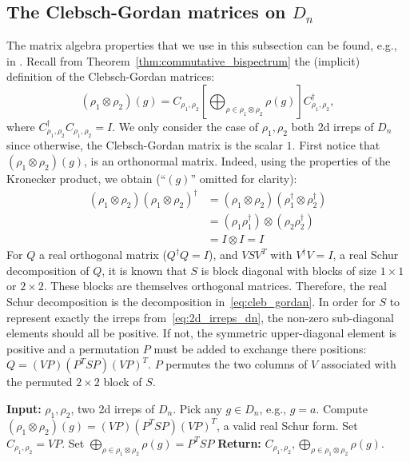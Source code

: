 \documentclass{article}
\theoremstyle{plain}
\theoremstyle{definition}
\theoremstyle{remark}
\begin{document}
\subsection{The Clebsch-Gordan matrices on $D_n$}\label{app:clebsch_gordan}
The matrix algebra properties that we use in this subsection can be found, e.g., in \cite{bhatia97}. Recall from Theorem~\ref{thm:commutative_bispectrum} the (implicit) definition of the Clebsch-Gordan matrices:
\begin{equation}\label{eq:cleb_gordan}
    (\rho_1\otimes\rho_2)(g) = C_{\rho_1,\rho_2}\left[ \bigoplus_{\rho\in\rho_1\otimes\rho_2} \rho(g) \right]C_{\rho_1,\rho_2}^\dagger,
\end{equation}
where $C_{\rho_1,\rho_2}^\dagger C_{\rho_1,\rho_2}=I$.
We only consider the case of $\rho_1,\rho_2$ both 2d irreps of $D_n$ since otherwise, the Clebsch-Gordan matrix is the scalar $1$.
First notice that $(\rho_1\otimes\rho_2)(g)$, is an orthonormal matrix. Indeed, using the properties of the Kronecker product, we obtain (``$(g)$'' omitted for clarity):
\begin{align*}
    (\rho_1\otimes\rho_2)(\rho_1\otimes\rho_2)^\dagger &= (\rho_1\otimes\rho_2)(\rho_1^\dagger\otimes\rho_2^\dagger)\\
    &=(\rho_1\rho_1^\dagger)\otimes (\rho_2\rho_2^\dagger)\\
    &=I \otimes I = I
\end{align*}
For $Q$ a real orthogonal matrix ($Q^\dagger Q = I$), and $VSV^T$ with $V^\dagger V = I$, a real Schur decomposition of $Q$, it is known that $S$ is block diagonal with blocks of size $1\times 1$ or $2\times 2$. These blocks are themselves orthogonal matrices. Therefore, the real Schur decomposition is the decomposition in~\eqref{eq:cleb_gordan}. In order for $S$ to represent exactly the irreps from~\eqref{eq:2d_irreps_dn}, the non-zero sub-diagonal elements should all be positive. If not, the symmetric upper-diagonal element is positive and a permutation $P$ must be added to exchange there positions: $Q = (VP)(P^TSP)(VP)^T$. $P$ permutes the two columns of $V$ associated with the permuted $2\times 2$ block of $S$.
\begin{algorithm}
    \caption{Compute Clebsch-Gordan matrices on $D_n$}
    \begin{algorithmic}[1]
        \STATE \textbf{Input:} $\rho_1, \rho_2$, two 2d irreps of $D_n$.
        \STATE Pick any $g\in D_n$, e.g., $g = a$.
        \STATE Compute  $(\rho_1\otimes\rho_2)(g) = (VP)(P^TSP)(VP)^T$, a valid real Schur form.
        \STATE Set $C_{\rho_1,\rho_2} = VP$.
        \STATE Set $\bigoplus_{\rho\in\rho_1\otimes\rho_2} \rho(g) = P^TSP$
        \STATE \textbf{Return:} $C_{\rho_1,\rho_2}, \bigoplus_{\rho\in\rho_1\otimes\rho_2}\rho(g)$.
    \end{algorithmic}
\end{algorithm}
\end{document}
